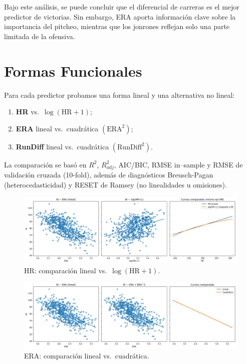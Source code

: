 \documentclass[man,floatsintext]{apa7}
\begin{document}
\noindent Bajo este análisis, se puede concluir que el diferencial de carreras es el mejor predictor de victorias. Sin embargo, ERA aporta información clave sobre la importancia del pitcheo, mientras que los jonrones reflejan solo una parte limitada de la ofensiva.
\section{Formas Funcionales}
Para cada predictor probamos una forma lineal y una alternativa no lineal:

\begin{enumerate}
    \item \textbf{HR} vs.\ \(\log(\text{HR}+1)\); 
    \item \textbf{ERA} lineal vs.\ cuadrática \((\text{ERA}^2)\); 
    \item \textbf{RunDiff} lineal vs.\ cuadrática \((\text{RunDiff}^2)\).
\end{enumerate}
La comparación se basó en \(R^2\), \(R^2_{adj}\), AIC/BIC, RMSE in--sample y RMSE de validación cruzada (10-fold), además de diagnósticos Breusch-Pagan (heterocedasticidad) y RESET de Ramsey (no linealidades u omisiones).



\begin{figure}[H]\centering
    \includegraphics[width=\textwidth]{../plots/formas_funcionales_HR.png}
    \caption{HR: comparación lineal vs.\ \(\log(\text{HR}+1)\).}
    \label{fig:ff_hr}
\end{figure}

\begin{figure}[H]\centering
    \includegraphics[width=\textwidth]{../plots/formas_funcionales_ERA.png}
    \caption{ERA: comparación lineal vs.\ cuadrática.}
    \label{fig:ff_era}
\end{figure}
    
\end{document}
